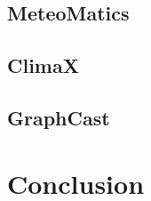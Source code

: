 \documentclass[conference]{IEEEtran}
\begin{document}
\subsection{MeteoMatics}\label{subsec:meteomatics}


\subsection{ClimaX}\label{subsec:climax}


\subsection{GraphCast}\label{subsec:graphcast}


\section{Conclusion}\label{sec:conclusion}



\end{document}

